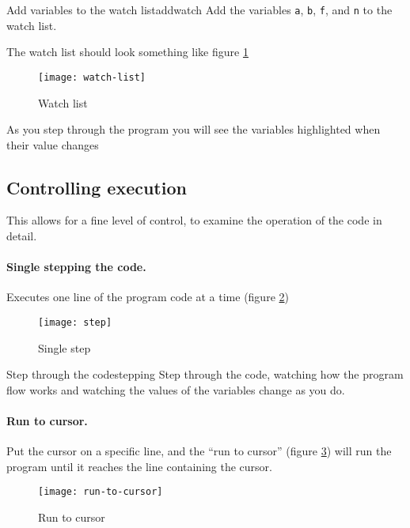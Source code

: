 \documentclass[a4paper]{tufte-handout}
\begin{document}
\begin{exercise}{Add variables to the watch list}{addwatch}
  Add the variables \texttt{a}, \texttt{b}, \texttt{f}, and \texttt{n}
  to the watch list.
\end{exercise}

The watch list should look something like figure \ref{fig:watch}
\begin{figure}
  \flushright
  \texttt{[image: watch-list]}
  \caption{Watch list}
  \label{fig:watch}
\end{figure}
\begin{tcolorbox}[colframe=red!50!black]
As you step through the program you will see the variables highlighted
when their value changes
\end{tcolorbox}

\subsection{Controlling execution}
  This allows for a fine level of
control, to examine the operation of the code in detail.  

\paragraph{Single stepping the code.}  Executes one line of the
program code at a time (figure \ref{fig:step})
\begin{figure}
  \texttt{[image: step]}
  \caption{Single step}
  \label{fig:step}
\end{figure}
\begin{exercise}{Step through the code}{stepping}
  Step through the code, watching how the program flow works and
  watching the values of the variables change as you do.
\end{exercise}

\paragraph{Run to cursor.}  Put the cursor on a specific line, and the
``run to cursor'' (figure \ref{fig:runcursor}) will run the program
until it reaches the line containing the cursor.
\begin{figure}
  \texttt{[image: run-to-cursor]}
  \caption{Run to cursor}
  \label{fig:runcursor}
\end{figure}
\end{document}
